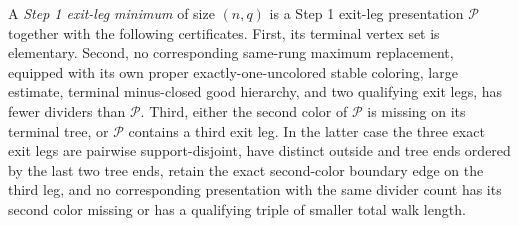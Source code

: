 \begin{definition}
A \emph{Step 1 exit-leg minimum} of size $(n,q)$ is a Step 1 exit-leg
presentation $\mathcal P$ together with the following certificates.
First, its terminal vertex set is elementary.  Second, no corresponding
same-rung maximum replacement, equipped with its own proper
exactly-one-uncolored stable coloring, large estimate, terminal
minus-closed good hierarchy, and two qualifying exit legs, has fewer
dividers than $\mathcal P$.  Third, either the second color of
$\mathcal P$ is missing on its terminal tree, or $\mathcal P$ contains
a third exit leg.  In the latter case the three exact exit legs are
pairwise support-disjoint, have distinct outside and tree ends ordered
by the last two tree ends, retain the exact second-color boundary edge
on the third leg, and no corresponding presentation with the same
divider count has its second color missing or has a qualifying triple
of smaller total walk length.
\end{definition}
